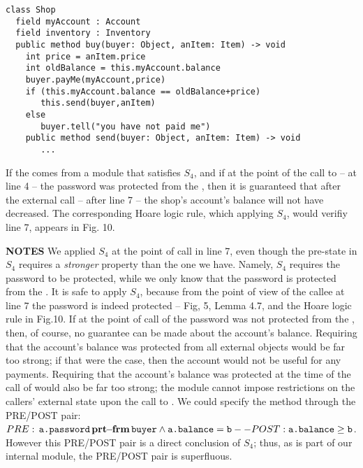 \begin{lstlisting}
class Shop
  field myAccount : Account
  field inventory : Inventory    
  public method buy(buyer: Object, anItem: Item) -> void
    int price = anItem.price
    int oldBalance = this.myAccount.balance
    buyer.payMe(myAccount,price)
    if (this.myAccount.balance == oldBalance+price)
       this.send(buyer,anItem)
    else
       buyer.tell("you have not paid me") 
    public method send(buyer: Object, anItem: Item) -> void  
       ...            
\end{lstlisting}
 
\noindent
 
If the  comes from a module that satisfies $S_4$, and if at the point of the call to  -- \ie at line 4 -- the password was protected from the , then it is guaranteed that after the external call -- \ie after line 7 --  the shop's account's balance will not have decreased.
{The corresponding Hoare logic rule, which applying  $S_4$, would verifiy line 7, appears in Fig. 10.}

 

\vspace{.1cm}

  \noindent
 \textbf{NOTES}
 \notesep We   applied $S_4$ at the point of call in line 7, even   though  
 the pre-state in $S_4$ requires %
 a \emph{stronger} property than the one we have.
 Namely,   $S_4$ requires   the password to be protected, while we only know 
  that the password is protected from the  .
It is safe to apply $S_4$,  because from the point of view of the callee at line 7 the password is indeed protected -- \cf Fig, 5,   Lemma 4.7, and the 
  Hoare logic rule in Fig.10.
  \notesep  If at the point of call of  the password was not protected from the , then, of course, no guarantee can be made about the account's balance.
 \notesep Requiring that the account's balance was protected from all external objects would be far too strong; if that were the case, then the account would not be useful for any payments.
 \notesep Requiring that the account's balance was protected at the time of the call of  would also be far too strong; the module cannot impose restrictions on the callers' external state  upon the call to .
 \notesep 
 We could specify the method  through the PRE/POST pair: $PRE: {\, {\texttt{a.password}}\, \mathbf{prt\!\!-\!\!frm}\, {\texttt{buyer}}} \wedge {{\texttt{a.balance}}}={\texttt{b}} -- POST: {\texttt{a.balance}}\geq {\texttt{b}}$. However this PRE/POST pair is a direct conclusion of $S_4$; thus, as  is part of our internal module, the PRE/POST pair is superfluous.
 
